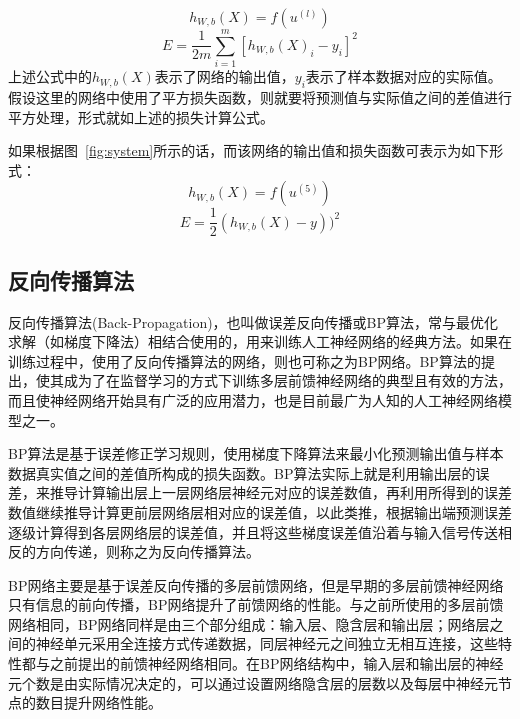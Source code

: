 \begin{equation}
h_{W,b}(X)=f(u^{(l)})
\end{equation}
\begin{equation}
E=\frac{1}{2m}\sum_{i=1}^{m}[h_{W,b}(X)_{i}-y_{i}]^{2}
\end{equation}
上述公式中的$h_{W,b}(X)$表示了网络的输出值，$y_{i}$表示了样本数据对应的实际值。假设这里的网络中使用了平方损失函数，则就要将预测值与实际值之间的差值进行平方处理，形式就如上述的损失计算公式。

如果根据图~\ref{fig:system}所示的话，而该网络的输出值和损失函数可表示为如下形式：
\begin{equation}
h_{W,b}(X)=f(u^{(5)})
\end{equation}
\begin{equation}
E=\frac{1}{2}(h_{W,b}(X)-y))^{2}
\end{equation}

\subsection{反向传播算法}

反向传播算法(Back-Propagation)，也叫做误差反向传播或BP算法，常与最优化求解（如梯度下降法）相结合使用的，用来训练人工神经网络的经典方法。如果在训练过程中，使用了反向传播算法的网络，则也可称之为BP网络。BP算法的提出，使其成为了在监督学习的方式下训练多层前馈神经网络的典型且有效的方法，而且使神经网络开始具有广泛的应用潜力，也是目前最广为人知的人工神经网络模型之一。

BP算法是基于误差修正学习规则，使用梯度下降算法来最小化预测输出值与样本数据真实值之间的差值所构成的损失函数。BP算法实际上就是利用输出层的误差，来推导计算输出层上一层网络层神经元对应的误差数值，再利用所得到的误差数值继续推导计算更前层网络层相对应的误差值，以此类推，根据输出端预测误差逐级计算得到各层网络层的误差值，并且将这些梯度误差值沿着与输入信号传送相反的方向传递，则称之为反向传播算法。

BP网络主要是基于误差反向传播的多层前馈网络，但是早期的多层前馈神经网络只有信息的前向传播，BP网络提升了前馈网络的性能。与之前所使用的多层前馈网络相同，BP网络同样是由三个部分组成：输入层、隐含层和输出层；网络层之间的神经单元采用全连接方式传递数据，同层神经元之间独立无相互连接，这些特性都与之前提出的前馈神经网络相同。在BP网络结构中，输入层和输出层的神经元个数是由实际情况决定的，可以通过设置网络隐含层的层数以及每层中神经元节点的数目提升网络性能。

